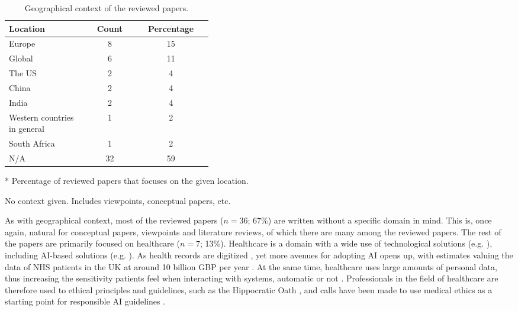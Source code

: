 \begin{table}[htpb]
    \centering
    \caption{Geographical context of the reviewed papers.}
    \label{tab:summary-context}
    \begin{threeparttable}
    \begin{tabular}{p{0.4\linewidth}cc}
    \toprule
        \textbf{Location} & \textbf{Count} & \textbf{Percentage}\tnote{*} \\
    \midrule
        Europe                          & 8     & 15 \\ 
        Global                          & 6     & 11 \\ 
        The US                          & 2     & 4 \\
        China                           & 2     & 4 \\ 
        India                           & 2     & 4 \\ 
        Western countries in general    & 1     & 2 \\ 
        South Africa                    & 1     & 2 \\
        N/A\tnote{\textdagger}          & 32    & 59 \\ 
    \bottomrule
    \end{tabular}
    \begin{tablenotes}
        \footnotesize
        \item [*] Percentage of reviewed papers that focuses on the given location.
        \item [\textdagger] No context given. Includes viewpoints, conceptual papers, etc.
    \end{tablenotes}
\end{threeparttable}
\end{table}

As with geographical context, most of the reviewed papers ($n = 36$; 67\%) are written without a specific domain in mind. This is, once again, natural for conceptual papers, viewpoints and literature reviews, of which there are many among the reviewed papers. The rest of the papers are primarily focused on healthcare ($n = 7$; 13\%). Healthcare is a domain with a wide use of technological solutions (e.g. \cite{Azaria_2016,Martinez_2008,Son_2014}), including AI-based solutions (e.g. \cite{Singh_2023,Kumar_2023}). As health records are digitized \parencite{Rajkomar_2018}, yet more avenues for adopting AI opens up, with estimates valuing the data of NHS patients in the UK at around 10 billion GBP per year \parencite{Downey_2019}. At the same time, healthcare uses large amounts of personal data, thus increasing the sensitivity patients feel when interacting with systems, automatic or not \parencite{Gupta_2021}. Professionals in the field of healthcare are therefore used to ethical principles and guidelines, such as the Hippocratic Oath \parencite{Wiesing_2020}, and calls have been made to use medical ethics as a starting point for responsible AI guidelines \parencite{DaltonBrown_2020, Siala_2022}.

